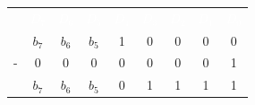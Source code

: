 \begin{tabular}{ccccccccc}\rowcolor{DEplava}&\textcolor{white}{$D_7$}&\textcolor{white}{$D_6$}&\textcolor{white}{$D_5$}&\textcolor{white}{$D_4$}&\textcolor{white}{$D_3$}&\textcolor{white}{$D_2$}&\textcolor{white}{$D_1$}&\textcolor{white}{$D_0$}\\
\rowcolor{DEplava!12}&$b_7$&$b_6$&$b_5$&\textcolor{DEcrvena}{1}&0&0&0&0\\
\rowcolor{DEplava!7}-&0&0&0&\textcolor{DEcrvena}{0}&0&0&0&1\\
\rowcolor{DEplava!12}&$b_7$&$b_6$&$b_5$&\textcolor{DEcrvena}{0}&1&1&1&1\\
\end{tabular}